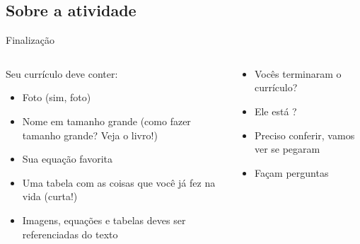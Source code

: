     \subsection{Sobre a atividade}
    \begin{frame}{Finalização}
        \begin{columns}
            \begin{column}{0.5\linewidth}
                \justify
                Seu currículo deve conter:
                \begin{itemize}[<+->]
                    \item Foto (sim, foto)
                    \item Nome em tamanho grande (como fazer tamanho grande? Veja o livro!)
                    \item Sua equação favorita
                    \item Uma tabela com as coisas que você já fez na vida (curta!)
                    \item Imagens, equações e tabelas deves ser referenciadas do texto
                \end{itemize}
            \end{column}
            \begin{column}{0.5\linewidth}
                \justify
                \begin{itemize}[<+->]
                    \item Vocês terminaram o currículo?
                    \item Ele está \impecavel?
                    \item Preciso conferir, vamos ver se pegaram
                    \item Façam perguntas
                \end{itemize}
            \end{column}
        \end{columns}
    \end{frame}

    \begin{frame}
        \centering
    \end{frame}


